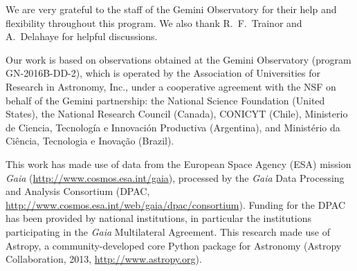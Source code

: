 \documentclass[twocolumn]{aastex61}
\def \frb {FRB\,121102}
\begin{document}



\acknowledgements 
We are very grateful to the staff of the Gemini Observatory for their help and flexibility throughout this program. We also thank R.~F.~Trainor and A.~Delahaye for helpful discussions.

Our work is based on observations obtained at the Gemini Observatory (program GN-2016B-DD-2), which is operated by the Association of Universities for Research in Astronomy, Inc., under a cooperative agreement with the NSF on behalf of the Gemini partnership: the National Science Foundation (United States), the National Research Council (Canada), CONICYT (Chile), Ministerio de Ciencia, Tecnolog\'{i}a e Innovaci\'{o}n Productiva (Argentina), and Minist\'{e}rio da Ci\^{e}ncia, Tecnologia e Inova\c{c}\~{a}o (Brazil). 

This work has made use of data from the European Space Agency (ESA) mission {\it Gaia} (\url{http://www.cosmos.esa.int/gaia}), processed by the {\it Gaia} Data Processing and Analysis Consortium (DPAC, \url{http://www.cosmos.esa.int/web/gaia/dpac/consortium}). Funding for the DPAC has been provided by national institutions, in particular the institutions participating in the {\it Gaia} Multilateral Agreement. This research made use of Astropy, a community-developed core Python package for Astronomy (Astropy Collaboration, 2013, \url{http://www.astropy.org}).
\end{document}
